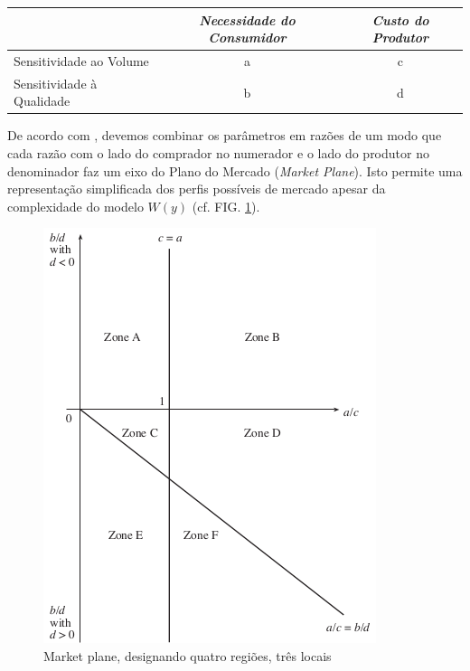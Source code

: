 \documentclass[a4paper, 12pt, openright, oneside, german, french, english, brazil]{abntex2}
\begin{document}
	\begin{table}[ht]
		{\begin{tabular}{l c c}
				\hline
				\hline
				& \textit{Necessidade do Consumidor} & \textit{Custo do Produtor} \\
				\hline
				Sensitividade ao Volume	  & a					  & c						\\
				Sensitividade à Qualidade & b					  & d						\\
				\hline			
			\end{tabular}
		}
		{}
	\end{table}
	
	
	
	De acordo com , devemos combinar os parâmetros em razões de um modo que cada razão com o lado do comprador no numerador e o lado do produtor no denominador faz um eixo do Plano do Mercado (\textit{Market Plane}). Isto permite uma representação simplificada dos perfis possíveis de mercado apesar da complexidade do modelo $W(y)$ (cf. FIG. \ref{market-plane}).
	
	
	\begin{figure}[th]
		\centering
		\caption{Market plane, designando quatro regiões, três locais}
		\label{market-plane}
		\includegraphics[scale=1]{market_plane_favereau.png}
	\end{figure}
	
\end{document}
